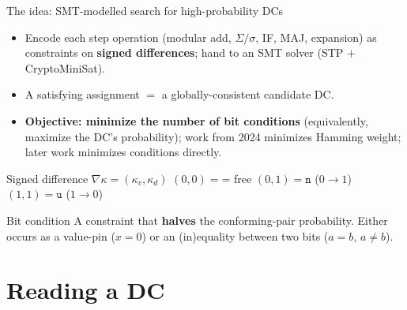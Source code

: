 \documentclass[aspectratio=169,9pt]{beamer}
\newcommand{\nn}{\texttt{n}}
\newcommand{\uu}{\texttt{u}}
\newcommand{\eq}{\texttt{=}}
\newcommand{\key}[1]{\textcolor{key}{\textbf{#1}}}
\begin{document}
\begin{frame}{The idea: SMT-modelled search for high-probability DCs}
\begin{itemize}
  \item Encode each step operation (modular add, $\Sigma/\sigma$, IF, MAJ, expansion) as constraints on \key{signed differences}; hand to an SMT solver (STP $+$ CryptoMiniSat).
  \item A satisfying assignment $=$ a globally-consistent candidate DC.
  \item \key{Objective: minimize the number of bit conditions} (equivalently, maximize the DC's probability); work from 2024 minimizes Hamming weight; later work minimizes conditions directly.
\end{itemize}


\begin{block}{Signed difference $\nabla\kappa=(\kappa_v,\kappa_d)$}
\centering\small
$(0,0)=\eq$ free \;$(0,1)=\nn$ ($0\!\to\!1$) \;$(1,1)=\uu$ ($1\!\to\!0$)
\end{block}

\begin{alertblock}{Bit condition}
\small A constraint that \key{halves} the conforming-pair probability. Either occurs as a value-pin ($x=0$) or an (in)equality between two bits ($a=b$, $a\neq b$).
\end{alertblock}

\end{frame}

\section{Reading a DC}
\end{document}
